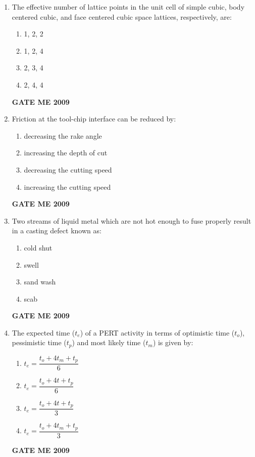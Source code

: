 \documentclass[journal]{IEEEtran}
\begin{document}
\begin{enumerate}[leftmargin=0pt]
\item The effective number of lattice points in the unit cell of simple cubic, body centered cubic, and face centered cubic space lattices, respectively, are:
  \begin{enumerate}[label=(\alph*)]
    \item 1, 2, 2
    \item 1, 2, 4
    \item 2, 3, 4
    \item 2, 4, 4
  \end{enumerate}
  \hfill{\textbf{GATE ME 2009}}


\item Friction at the tool-chip interface can be reduced by:
  \begin{enumerate}[label=(\alph*)]
    \item decreasing the rake angle
    \item increasing the depth of cut
    \item decreasing the cutting speed
    \item increasing the cutting speed
  \end{enumerate}
  \hfill{\textbf{GATE ME 2009}}


\item Two streams of liquid metal which are not hot enough to fuse properly result in a casting defect known as:
  \begin{enumerate}[label=(\alph*)]
    \item cold shut
    \item swell
    \item sand wash
    \item scab
  \end{enumerate}
  \hfill{\textbf{GATE ME 2009}}


\item The expected time ($t_e$) of a PERT activity in terms of optimistic time ($t_o$), pessimistic time ($t_p$) and most likely time ($t_m$) is given by:
  \begin{enumerate}[label=(\alph*)]
    \item $t_e = \dfrac{t_o + 4 t_m + t_p}{6}$
    \item $t_e = \dfrac{t_o + 4 t + t_p}{6}$
    \item $t_e = \dfrac{t_o + 4 t + t_p}{3}$
    \item $t_e = \dfrac{t_o + 4 t_m + t_p}{3}$
  \end{enumerate}
  \hfill{\textbf{GATE ME 2009}}


\end{enumerate}
\end{document}
